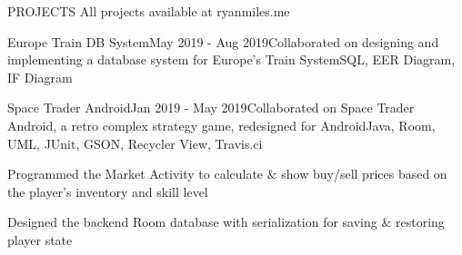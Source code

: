 \documentclass{resume} %
\begin{document}
\begin{rSectionProjects}{PROJECTS} {All projects available at ryanmiles.me}
\begin{rSubsectionProjects}{Europe Train DB System}{May 2019 - Aug 2019}{Collaborated on designing and implementing a database system for Europe's Train System}{SQL, EER Diagram, IF Diagram} {}
\end{rSubsectionProjects} 


\begin{rSubsectionProjects}{Space Trader Android}{Jan 2019 - May 2019}{Collaborated on Space Trader Android, a retro complex strategy game, redesigned for Android}{Java, Room, UML, JUnit, GSON, Recycler View, Travis.ci} {}
	\item Programmed the Market Activity to calculate \& show buy/sell prices based on the player's inventory and skill level
	\item Designed the backend Room database with serialization for saving \& restoring player state
	
\end{rSubsectionProjects} 


\end{rSectionProjects} 
\end{document}
